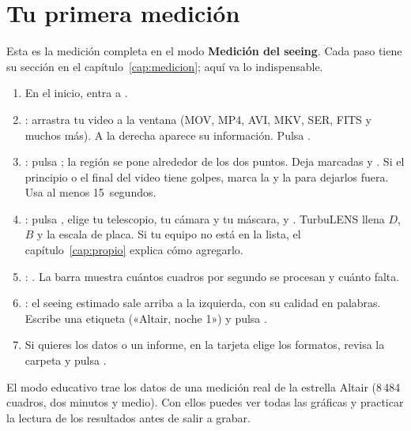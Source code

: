 \section{Tu primera medición}\label{sec:primera}

Esta es la medición completa en el modo \textbf{Medición del seeing}. Cada paso tiene su sección en el
capítulo~\ref{cap:medicion}; aquí va lo indispensable.

\begin{pasos}
\begin{enumerate}[label=\textbf{\arabic*.},leftmargin=1.6em,itemsep=0.45em]
\item En el inicio, entra a .
\item {}: arrastra tu video a la ventana (MOV, MP4, AVI, MKV, SER, FITS y muchos más). A la derecha aparece su
información. Pulsa .
\item {}: pulsa ; la región se pone alrededor de los dos puntos.
Deja marcadas  y . Si el principio o el final del video tiene
golpes, marca la \boton{[ Entrada} y la \boton{Salida ]} para dejarlos fuera. Usa al menos 15~segundos.
\item {}: pulsa , elige tu telescopio, tu cámara y tu máscara, y
. TurbuLENS llena $D$, $B$ y la escala de placa. Si tu equipo no está en la lista, el
capítulo~\ref{cap:propio} explica cómo agregarlo.
\item {}: . La barra muestra cuántos cuadros por segundo se procesan y cuánto falta.
\item {}: el seeing estimado sale arriba a la izquierda, con su calidad en palabras. Escribe una
etiqueta («Altair, noche 1») y pulsa .
\item Si quieres los datos o un informe, en la tarjeta  elige los formatos, revisa la carpeta y pulsa
.
\end{enumerate}
\end{pasos}

\begin{consejo}
El modo educativo trae los datos de una medición real de la estrella Altair (8\,484 cuadros, dos minutos y medio). Con
ellos puedes ver todas las gráficas y practicar la lectura de los resultados antes de salir a grabar.
\end{consejo}


